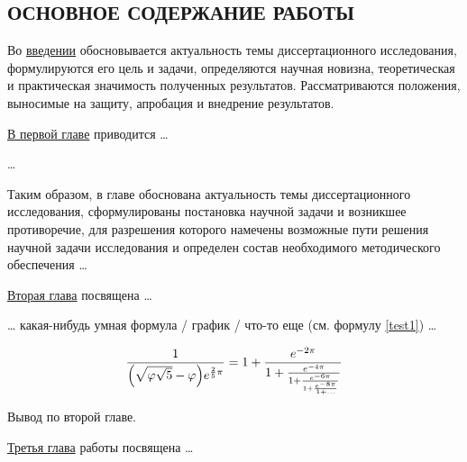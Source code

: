 
%
%
%
%

\subsection*{\MakeUppercase{Основное содержание работы}}

Во \underline{введении} обосновывается актуальность темы
диссертационного исследования, формулируются его цель и задачи,
определяются научная новизна, теоретическая и практическая значимость
полученных результатов. Рассматриваются положения, выносимые на
защиту, апробация и внедрение результатов.



\underline{В первой главе} приводится \dots{}

\dots{}

Таким образом, в главе обоснована актуальность темы диссертационного
исследования, сформулированы постановка научной задачи и возникшее
противоречие, для разрешения которого намечены возможные пути решения
научной задачи исследования и определен состав необходимого
методического обеспечения \dots{}


\underline{Вторая глава} посвящена \dots{}

\dots{} какая-нибудь умная формула / график / что-то еще (см. формулу
\ref{test1}) \dots{}

\begin{center}
\begin{equation} \label{test1}
\frac{1}{\Bigl(\sqrt{\phi \sqrt{5}}-\phi\Bigr) e^{\frac25 \pi}} =
1+\frac{e^{-2\pi}} {1+\frac{e^{-4\pi}} {1+\frac{e^{-6\pi}}
{1+\frac{e^{-8\pi}} {1+\ldots} } } }
\end{equation}
\end{center}

Вывод по второй главе.


\underline{Третья глава} работы посвящена \dots{}

